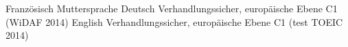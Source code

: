 

\begin{cvskills}

  \cvskill
    {Französisch} %
    {Muttersprache} %
  \cvskill
	{Deutsch} %
	{Verhandlungssicher, europäische Ebene C1 (WiDAF 2014)} %
  \cvskill
	{English} %
	{Verhandlungssicher, europäische Ebene C1 (test TOEIC 2014)} %
\end{cvskills}
